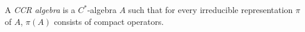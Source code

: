 A \emph{CCR algebra} is a $C^*$-algebra $A$ such that for every irreducible representation $\pi$ of $A$, $\pi(A)$ consists of compact operators.

